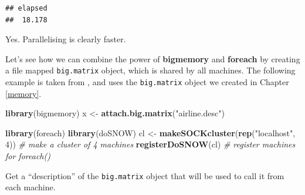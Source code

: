 \documentclass[]{book}
\newenvironment{Shaded}{\begin{snugshade}}{\end{snugshade}}
\newcommand{\KeywordTok}[1]{\textcolor[rgb]{0.13,0.29,0.53}{\textbf{#1}}}
\newcommand{\DataTypeTok}[1]{\textcolor[rgb]{0.13,0.29,0.53}{#1}}
\newcommand{\DecValTok}[1]{\textcolor[rgb]{0.00,0.00,0.81}{#1}}
\newcommand{\StringTok}[1]{\textcolor[rgb]{0.31,0.60,0.02}{#1}}
\newcommand{\CommentTok}[1]{\textcolor[rgb]{0.56,0.35,0.01}{\textit{#1}}}
\newcommand{\OtherTok}[1]{\textcolor[rgb]{0.56,0.35,0.01}{#1}}
\newcommand{\OperatorTok}[1]{\textcolor[rgb]{0.81,0.36,0.00}{\textbf{#1}}}
\newcommand{\NormalTok}[1]{#1}
\theoremstyle{definition}
\theoremstyle{definition}
\theoremstyle{definition}
\theoremstyle{remark}
\begin{document}
\begin{Shaded}
\end{Shaded}

\begin{verbatim}
## elapsed 
##  18.178
\end{verbatim}

Yes. Parallelising is clearly faster.

Let's see how we can combine the power of \textbf{bigmemory} and
\textbf{foreach} by creating a file mapped \texttt{big.matrix} object,
which is shared by all machines. The following example is taken from
\citet{kane2013scalable}, and uses the \texttt{big.matrix} object we
created in Chapter \ref{memory}.

\begin{Shaded}
\begin{Highlighting}[]
\KeywordTok{library}\NormalTok{(bigmemory)}
\NormalTok{x <-}\StringTok{ }\KeywordTok{attach.big.matrix}\NormalTok{(}\StringTok{"airline.desc"}\NormalTok{)}

\KeywordTok{library}\NormalTok{(foreach)}
\KeywordTok{library}\NormalTok{(doSNOW)}
\NormalTok{cl <-}\StringTok{ }\KeywordTok{makeSOCKcluster}\NormalTok{(}\KeywordTok{rep}\NormalTok{(}\StringTok{"localhost"}\NormalTok{, }\DecValTok{4}\NormalTok{)) }\CommentTok{# make a cluster of 4 machines}
\KeywordTok{registerDoSNOW}\NormalTok{(cl) }\CommentTok{# register machines for foreach()}
\end{Highlighting}
\end{Shaded}

Get a ``description'' of the \texttt{big.matrix} object that will be
used to call it from each machine.
\end{document}
